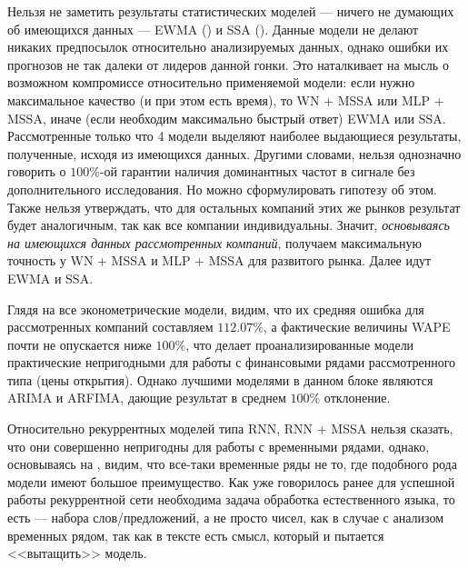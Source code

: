 Нельзя не заметить результаты статистических моделей --- ничего не думающих об имеющихся данных --- EWMA () и SSA (). Данные модели не делают никаких предпосылок относительно анализируемых данных, однако ошибки их прогнозов не так далеки от лидеров данной гонки. Это наталкивает на мысль о возможном компромиссе относительно применяемой модели: если нужно максимальное качество (и при этом есть время), то WN + MSSA или MLP + MSSA, иначе (если необходим максимально быстрый ответ) EWMA или SSA. Рассмотренные только что 4 модели выделяют наиболее выдающиеся результаты, полученные, исходя из имеющихся данных. Другими словами, нельзя однозначно говорить о $100\%$-ой гарантии наличия доминантных частот в сигнале без дополнительного исследования. Но можно сформулировать гипотезу об этом. Также нельзя утверждать, что для остальных компаний этих же рынков результат будет аналогичным, так как все компании индивидуальны. Значит, \textit{основываясь на имеющихся данных рассмотренных компаний}, получаем максимальную точность у WN + MSSA и MLP + MSSA для развитого рынка. Далее идут EWMA и SSA.

Глядя на все эконометрические модели, видим, что их средняя ошибка для рассмотренных компаний составляем $112.07\%$, а фактические величины WAPE почти не опускается ниже $100\%$, что делает проанализированные модели практические непригодными для работы с финансовыми рядами рассмотренного типа (цены открытия). Однако лучшими моделями в данном блоке являются ARIMA и ARFIMA, дающие результат в среднем $100\%$ отклонение.

Относительно рекуррентных моделей типа RNN, RNN + MSSA нельзя сказать, что они совершенно непригодны для работы с временными рядами, однако, основываясь на \cite{transformers_are_useless_for_TSF}, видим, что все-таки временные ряды не то, где подобного рода модели имеют большое преимущество. Как уже говорилось ранее для успешной работы рекуррентной сети необходима задача обработка естественного языка, то есть --- набора слов/предложений, а не просто чисел, как в случае с анализом временных рядом, так как в тексте есть смысл, который и пытается <<вытащить>> модель.

